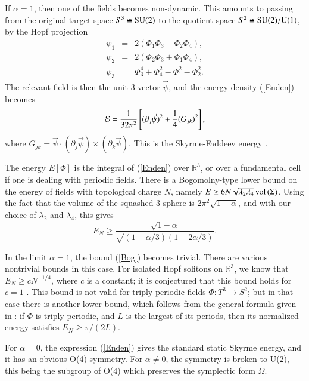 \documentclass[5p]{elsarticle}
\newcommand{\vol}{\mathop{\rm vol}\nolimits}
\newcommand{\pa}{\partial}
\newcommand{\RR}{\mathbb R}
\begin{document}
If $\alpha=1$, then one of the fields becomes non-dynamic. This amounts to
passing from the original target space $S^3\cong{\rm SU(2)}$ to the quotient space
$S^2\cong{\rm SU(2)/U(1)}$, by the Hopf projection
%
\begin{eqnarray}
\psi_1 &=& 2(\Phi_1\Phi_3-\Phi_2\Phi_4),   \nonumber \\
\psi_2 &=& 2(\Phi_2\Phi_3+\Phi_1\Phi_4),   \nonumber \\
\psi_3 &=& \Phi_3^4+\Phi_4^2-\Phi_1^2-\Phi_2^2. \label{hopfproj}
\end{eqnarray}
%
The relevant field is then the unit 3-vector $\vec\psi$, and the
energy density (\ref{Enden}) becomes
\begin{equation} \label{Enden_Hopf}
  {\cal E} = \frac{1}{32\pi^2}\left[(\pa_j\vec\psi)^2
       + \frac{1}{4}(G_{jk})^2\right],
\end{equation}
%
where $G_{jk}=
\vec\psi\cdot(\pa_j\vec\psi)\times(\pa_k\vec\psi)$. This is
the Skyrme-Faddeev energy \cite{FN97}.

The energy $E[\Phi]$ is the integral of (\ref{Enden}) over $\RR^3$,
or over a fundamental cell if one is dealing with periodic fields.
There is a Bogomolny-type lower bound \cite{M87} on the energy of fields
with topological charge $N$, namely
$E\geq6N\sqrt{\lambda_2 \lambda_4}\vol{(\Sigma)}$.
Using the fact that the volume of the squashed 3-sphere is
$2\pi^2\sqrt{1-\alpha}$, and with our choice of $\lambda_2$ and $\lambda_4$,
this gives
%
\begin{equation} \label{Bog}
    E_N \geq \frac{\sqrt{1-\alpha}}{\sqrt{(1-\alpha/3)(1-2\alpha/3)}}.
\end{equation}
%

In the limit $\alpha=1$, the bound (\ref{Bog}) becomes trivial.
There are various nontrivial bounds in this case.
For isolated Hopf solitons on $\RR^3$, we know that $E_N\geq cN^{-1/4}$,
where $c$ is a constant; it is conjectured that this bound holds for
$c=1$ \cite{W99}. This bound is not valid for triply-periodic fields
$\Phi:T^3\to S^2$; but in that case
there is another lower bound, which follows from the general formula
given in \cite{Sp10}: if $\Phi$ is triply-periodic, and $L$ is the largest
of its periods, then its normalized energy satisfies $E_N\geq\pi/(2L)$.

For $\alpha=0$, the expression (\ref{Enden}) gives the standard static
Skyrme energy, and it has an obvious O(4) symmetry. For $\alpha\neq0$,
the symmetry is broken to U(2), this being the subgroup of O(4) which
preserves the symplectic form $\Omega$.
\end{document}
